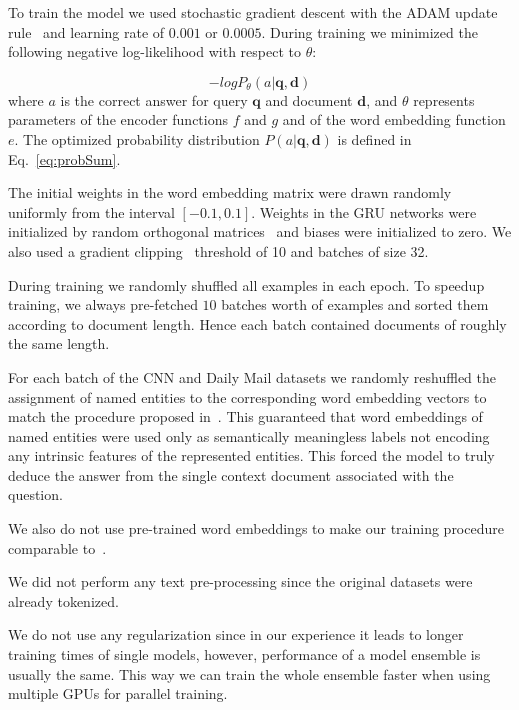 \documentclass[11pt]{article}
\newcommand{\RUDA}[1]{{\color{black}#1}}
\newcommand{\RUDAA}[1]{{\color{black}#1}}
\newcommand{\ctxTransducer}{f}
\newcommand{\queryEncoder}{g}
\newcommand{\querySeq}{\mathbf{q}}
\newcommand{\documentSeq}{\mathbf{d}}
\begin{document}
\RUDA{

To train the model we used stochastic gradient descent with the ADAM update rule~\cite{Kingma2015} and learning rate of $0.001$ or $0.0005$. During training we minimized the following negative log-likelihood with respect to $\theta$:

\begin{equation}
- log P_\theta(a|\querySeq,\documentSeq)
\label{eq:objective}
\end{equation}
where $a$ is the correct answer for query $\querySeq$ and document $\documentSeq$,  and $\theta$ represents parameters of the encoder functions $\ctxTransducer$ and $\queryEncoder$ and of the word embedding function $e$. The optimized probability distribution $P(a|\querySeq,\documentSeq)$ is defined in Eq.~\ref{eq:probSum}.


The initial weights in the word embedding matrix were drawn randomly uniformly from the interval $[-0.1, 0.1]$. Weights in the GRU networks were initialized by random orthogonal matrices~\cite{Saxe2014} and biases were initialized to zero. We also used a gradient clipping~\cite{Pascanu2012} threshold of 10 and batches of size 32.

During training we randomly shuffled all examples in each epoch. To speedup training, we always pre-fetched $10$ batches worth of examples and sorted them according to document length. Hence each batch contained documents of roughly the same length.

For each batch of the CNN and Daily Mail datasets we randomly reshuffled the assignment of named entities to the corresponding word embedding vectors to match the procedure proposed in~\cite{hermann2015teaching}. This guaranteed that word embeddings of named entities were used only as semantically meaningless labels not encoding any intrinsic features of the represented entities. This forced the model to truly deduce the answer from the single context document associated with the question.
}
\RUDAA{
We also do not use pre-trained word embeddings to make our training procedure comparable to~\cite{hermann2015teaching}.
}

We did not perform any text pre-processing since the original datasets were already tokenized.




\RUDAA{
We do not use any regularization since in our experience it leads to longer training times of single models, however, performance of a model ensemble is usually the same. This way we can train the whole ensemble faster when using multiple GPUs for parallel training.
}
\end{document}
